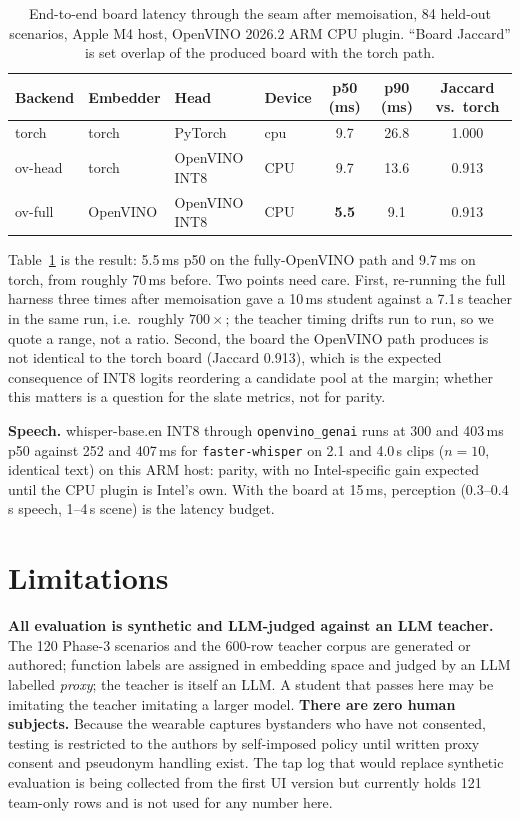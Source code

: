 \documentclass{article}
\begin{document}
\begin{table}[t]
\centering
\small
\caption{End-to-end board latency through the seam after memoisation, 84
held-out scenarios, Apple M4 host, OpenVINO 2026.2 ARM CPU plugin. ``Board
Jaccard'' is set overlap of the produced board with the torch path.}
\label{tab:latency}
\begin{tabular}{llllccc}
\toprule
\textbf{Backend} & \textbf{Embedder} & \textbf{Head} & \textbf{Device} & \textbf{p50 (ms)} & \textbf{p90 (ms)} & \textbf{Jaccard vs.\ torch} \\
\midrule
torch   & torch    & PyTorch        & cpu & 9.7 & 26.8 & 1.000 \\
ov-head & torch    & OpenVINO INT8  & CPU & 9.7 & 13.6 & 0.913 \\
ov-full & OpenVINO & OpenVINO INT8  & CPU & \textbf{5.5} & 9.1 & 0.913 \\
\bottomrule
\end{tabular}
\end{table}

Table~\ref{tab:latency} is the result: 5.5\,ms p50 on the fully-OpenVINO path
and 9.7\,ms on torch, from roughly 70\,ms before. Two points need care.
First, re-running the full harness three times after memoisation gave a
10\,ms student against a 7.1\,s teacher in the same run, i.e.\ roughly $700\times$; the teacher
timing drifts run to run, so we quote a range, not a ratio. Second, the board the
OpenVINO path produces is not identical to the torch board (Jaccard 0.913),
which is the expected consequence of INT8 logits reordering a candidate pool at
the margin; whether this matters is a question for the slate metrics, not for
parity.

\textbf{Speech.} whisper-base.en INT8 through \texttt{openvino\_genai} runs
at 300 and 403\,ms p50 against 252 and 407\,ms for \texttt{faster-whisper}
on 2.1 and 4.0\,s clips ($n{=}10$, identical text) on this ARM host: parity,
with no Intel-specific gain expected until the CPU plugin is Intel's own. With
the board at 15\,ms, perception (0.3--0.4\,s speech, 1--4\,s scene) is the
latency budget.

\section{Limitations}\label{sec:limits}

\textbf{All evaluation is synthetic and LLM-judged against an LLM teacher.}
The 120 Phase-3 scenarios and the 600-row teacher corpus are generated or
authored; function labels are assigned in embedding space and judged by an LLM
labelled \emph{proxy}; the teacher is itself an LLM. A student that passes here
may be imitating the teacher imitating a larger model. \textbf{There are zero
human subjects.} Because the wearable captures bystanders who have not
consented, testing is restricted to the authors by self-imposed policy until
written proxy consent and pseudonym handling exist. The tap log that would
replace synthetic evaluation is being collected from the first UI version but
currently holds 121 team-only rows and is not used for any number here.
\end{document}
